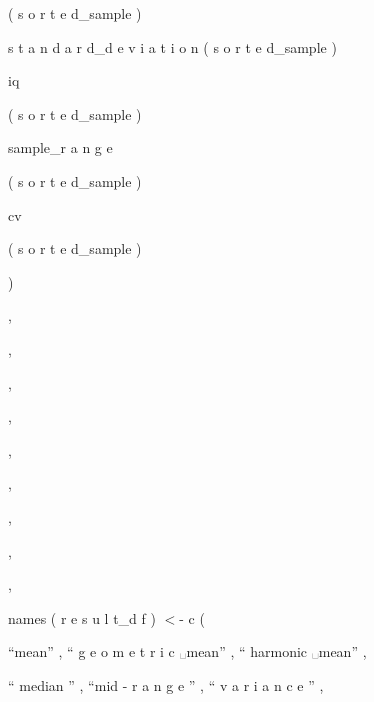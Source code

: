 \documentclass[a4paper,portrait,12pt]{article}
\begin{document}
\begin{flushleft}
( s o r t e d\_sample )
\end{flushleft}


\begin{flushleft}
s t a n d a r d\_d e v i a t i o n ( s o r t e d\_sample )
\end{flushleft}


\begin{flushleft}
iq
\end{flushleft}


\begin{flushleft}
( s o r t e d\_sample )
\end{flushleft}


\begin{flushleft}
sample\_r a n g e
\end{flushleft}


\begin{flushleft}
( s o r t e d\_sample )
\end{flushleft}


\begin{flushleft}
cv
\end{flushleft}


\begin{flushleft}
( s o r t e d\_sample )
\end{flushleft}


)





,


,


,


,


,


,


,


,


,





\begin{flushleft}
names ( r e s u l t\_d f ) $<$- c (
\end{flushleft}


\begin{flushleft}
{``}mean'' , {``} g e o m e t r i c ␣mean'' , {``} harmonic ␣mean'' ,
\end{flushleft}


\begin{flushleft}
{``} median '' , {``}mid - r a n g e '' , {``} v a r i a n c e '' ,
\end{flushleft}
\end{document}
